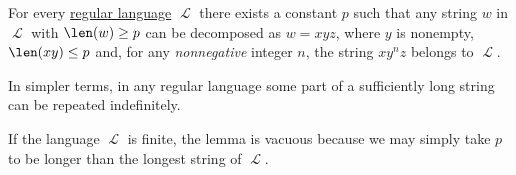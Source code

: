 \begin{lemma}\label{thm:regular_pumping_lemma}
  For every \hyperref[def:chomsky_hierarchy/regular]{regular language} \( \mscrL \) there exists a constant \( p \) such that any string \( w \) in \( \mscrL \) with \( \len(w) \geq p \) can be decomposed as \( w = x y z \), where \( y \) is nonempty, \( \len(xy) \leq p \) and, for any \emph{nonnegative} integer \( n \), the string \( x y^n z \) belongs to \( \mscrL \).
\end{lemma}
\begin{comments}
  \item In simpler terms, in any regular language some part of a sufficiently long string can be repeated indefinitely.
  \item If the language \( \mscrL \) is finite, the lemma is vacuous because we may simply take \( p \) to be longer than the longest string of \( \mscrL \).
\end{comments}
